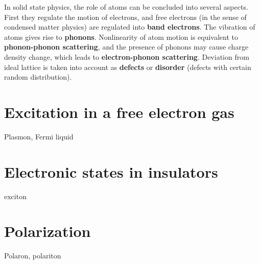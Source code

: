\documentclass[hyperref, a4paper]{article}
\newcommand*{\concept}[1]{{\textbf{#1}}}
\begin{document}
In solid state physics, the role of atoms can be concluded into several aspects. First they regulate 
the motion of electrons, and free electrons (in the sense of condensed matter physics) are regulated 
into \concept{band electrons}. The vibration of atoms gives rise to \concept{phonons}. Nonlinearity of 
atom motion is equivalent to \concept{phonon-phonon scattering}, and the presence of phonons may cause 
charge density change, which leads to \concept{electron-phonon scattering}. Deviation from ideal lattice
is taken into account as \concept{defects} or \concept{disorder} (defects with certain random distribution).

\section{Excitation in a free electron gas}

Plasmon, Fermi liquid

\section{Electronic states in insulators}

exciton

\section{Polarization}

Polaron, polariton
\end{document}
